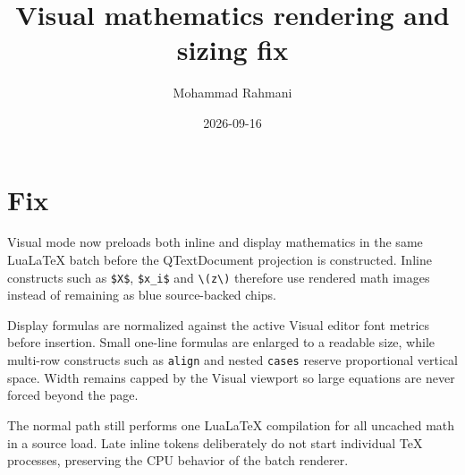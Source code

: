 \documentclass[a4paper]{article}
\title{Visual mathematics rendering and sizing fix}
\date{2026-09-16}
\author{Mohammad Rahmani}
\begin{document}
\maketitle

\section{Fix}
Visual mode now preloads both inline and display mathematics in the same
LuaLaTeX batch before the QTextDocument projection is constructed. Inline
constructs such as \verb|$X$|, \verb|$x_i$| and \verb|\(z\)| therefore use
rendered math images instead of remaining as blue source-backed chips.

Display formulas are normalized against the active Visual editor font metrics
before insertion. Small one-line formulas are enlarged to a readable size,
while multi-row constructs such as \texttt{align} and nested \texttt{cases}
reserve proportional vertical space. Width remains capped by the Visual
viewport so large equations are never forced beyond the page.

The normal path still performs one LuaLaTeX compilation for all uncached math
in a source load. Late inline tokens deliberately do not start individual TeX
processes, preserving the CPU behavior of the batch renderer.
\end{document}
